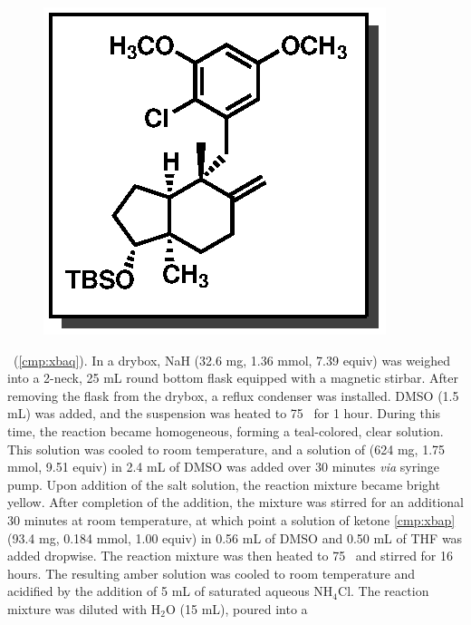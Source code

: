 \vspace{10pt}
\begin{figure}
  \vspace{-25pt}
  \begin{center}
    \includegraphics[scale=0.8]{chp_singlecarbon/images/xbaq}
  \end{center}
  \vspace{-30pt}
\end{figure}\noindent \textbf{\CMPxbaq}\ (\ref{cmp:xbaq}). In a drybox, NaH
(32.6 mg, 1.36 mmol, 7.39 equiv) was weighed into a 2-neck, 25 mL
round bottom flask equipped with a magnetic stirbar. After removing
the flask from the drybox, a reflux condenser was installed. DMSO (1.5 mL) was added, and the
suspension was heated to 75 \degc\  for 1 hour.
During this time, the reaction became homogeneous, forming a teal-colored, clear solution. This
solution was cooled to room temperature, and a solution of  (624 mg, 1.75 mmol, 9.51
equiv) in 2.4 mL of DMSO was added over 30 minutes \textit{via} syringe pump. Upon addition of the
salt solution, the reaction mixture became bright yellow. After completion of the addition, the
mixture was stirred for an additional 30 minutes at room temperature, at which point a solution of
ketone \ref{cmp:xbap} (93.4 mg, 0.184 mmol, 1.00 equiv) in 0.56 mL of DMSO and 0.50 mL of THF
was added dropwise. The reaction mixture was then heated to 75 \degc\  and stirred for 16 hours. The
resulting amber solution was cooled to room temperature and acidified by the addition of 5 mL of
saturated aqueous NH$_4$Cl. The reaction mixture was diluted with H$_2$O (15 mL), poured into a
